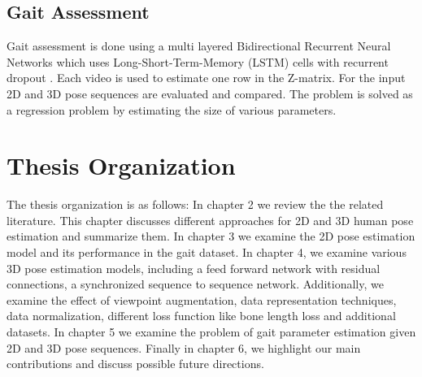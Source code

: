 \subsection{Gait Assessment}

Gait assessment is done using a multi layered Bidirectional Recurrent Neural Networks \parencite{schuster1997bidirectional} which uses Long-Short-Term-Memory (LSTM) \parencite{hochreiter1997long} cells with recurrent dropout \parencite{semeniuta2016recurrent}. Each video is used to estimate one row in the Z-matrix. For the input 2D and 3D pose sequences are evaluated and compared. The problem is solved as a regression problem by estimating the size of various parameters.

\section{Thesis Organization}

The thesis organization is as follows: In chapter 2 we review the the related literature. This chapter discusses different approaches for 2D and 3D human pose estimation and summarize them. In chapter 3 we examine the 2D pose estimation model and its performance in the gait dataset. In chapter 4, we examine various 3D pose estimation models, including a feed forward network with residual connections, a synchronized sequence to sequence network. Additionally, we examine the effect of viewpoint augmentation, data representation techniques, data normalization, different loss function like bone length loss and additional datasets. In chapter 5 we examine the problem of gait parameter estimation given 2D and 3D pose sequences. Finally in chapter 6, we highlight our main contributions and discuss possible future directions. 